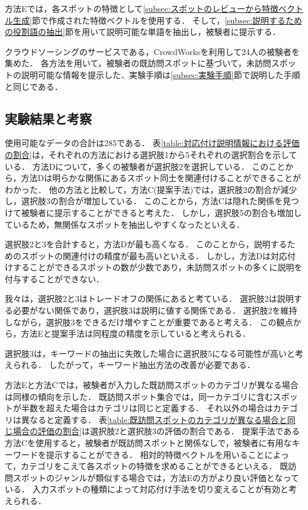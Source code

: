 \documentclass[submit,techrep,noauthor]{ipsj}
\begin{document}
方法Eでは，各スポットの特徴として\ref{subsec:スポットのレビューから特徴ベクトル生成}節で作成された特徴ベクトルを使用する．
そして，\ref{subsec:説明するための役割語の抽出}節を用いて説明可能な単語を抽出し，被験者に提示する．

クラウドソーシングのサービスである，CrowdWorksを利用して24人の被験者を集めた．
各方法を用いて，被験者の既訪問スポットに基づいて，未訪問スポットの説明可能な情報を提示した．実験手順は\ref{subsec:実験手順}節で説明した手順と同じである．

\subsection{実験結果と考察}

使用可能なデータの合計は285である．
表\ref{table:対応付け説明情報における評価の割合}は，それぞれの方法における選択肢1から5それぞれの選択割合を示している．
方法Dについて，多くの被験者が選択肢2を選択している．
このことから，方法Dは明らかな関係にあるスポット同士を関連付けることができることがわかった．
他の方法と比較して，方法C(提案手法)では，選択肢2の割合が減少し，選択肢3の割合が増加している．
このことから，方法Cは隠れた関係を見つけて被験者に提示することができると考えた．
しかし，選択肢5の割合も増加しているため，無関係なスポットを抽出しやすくなったといえる．

選択肢2と3を合計すると，方法Dが最も高くなる．
このことから，説明するためのスポットの関連付けの精度が最も高いといえる．
しかし，方法Dは対応付けすることができるスポットの数が少数であり，未訪問スポットの多くに説明を付与することができない．

我々は，選択肢2と3はトレードオフの関係にあると考ている．
選択肢2は説明する必要がない関係であり，選択肢3は説明に値する関係である．
選択肢2を維持しながら，選択肢3をできるだけ増やすことが重要であると考える．
この観点から，方法Eと提案手法は同程度の精度を示していると考えられる．

選択肢3は，キーワードの抽出に失敗した場合に選択肢5になる可能性が高いと考えられる．
したがって，キーワード抽出方法の改善が必要である．

方法Eと方法Cでは，被験者が入力した既訪問スポットのカテゴリが異なる場合は同様の傾向を示した．
既訪問スポット集合では，同一カテゴリに含むスポットが半数を超えた場合はカテゴリは同じと定義する．
それ以外の場合はカテゴリは異なると定義する．
表\ref{table:既訪問スポットのカテゴリが異なる場合と同じ場合の評価の割合}は選択肢2と選択肢3の評価の割合である．
提案手法である方法Cを使用すると，被験者が既訪問スポットと関係なしで，被験者に有用なキーワードを提示することができる．
相対的特徴ベクトルを用いることによって，カテゴリをこえて各スポットの特徴を求めることができるといえる．
既訪問スポットのジャンルが類似する場合では，方法Eの方がより良い評価となっている．
入力スポットの種類によって対応付け手法を切り変えることが有効と考えられる．
\end{document}
